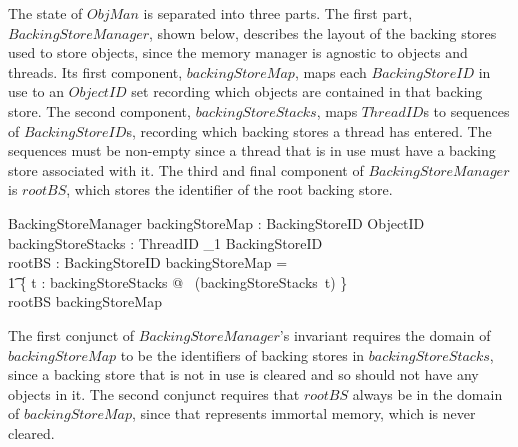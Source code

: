 The state of $ObjMan$ is separated into three parts.
The first part, $BackingStoreManager$, shown below, describes the
layout of the backing stores used to store objects, since the memory
manager is agnostic to objects and threads.
Its first component, $backingStoreMap$, maps each $BackingStoreID$ in
use to an $ObjectID$ set recording which objects are contained in that
backing store.
The second component, $backingStoreStacks$, maps $ThreadID$s to
sequences of $BackingStoreID$s, recording which backing stores a
thread has entered.
The sequences must be non-empty since a thread that is in use must
have a backing store associated with it.
The third and final component of $BackingStoreManager$ is $rootBS$,
which stores the identifier of the root backing store.
\begin{schema}{BackingStoreManager}
	backingStoreMap : BackingStoreID \pfun \finset ObjectID \\
	backingStoreStacks : ThreadID \pfun \seq_1 BackingStoreID \\
	rootBS : BackingStoreID
\where
	\dom backingStoreMap = {} \\
	\t1 \bigcup \{ t : \dom backingStoreStacks @ \ran~(backingStoreStacks~t) \} \\
	rootBS \in \dom backingStoreMap
\end{schema}
The first conjunct of $BackingStoreManager$'s invariant requires the
domain of $backingStoreMap$ to be the identifiers of backing stores in
$backingStoreStacks$, since a backing store that is not in use is
cleared and so should not have any objects in it.
The second conjunct requires that $rootBS$ always be in the domain of
$backingStoreMap$, since that represents immortal memory, which is
never cleared.

